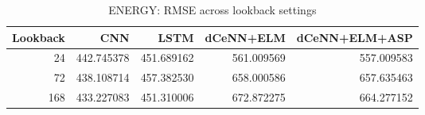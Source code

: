 \begin{table}
\caption{ENERGY: RMSE across lookback settings}
\begin{tabular}{rrrrr}
\toprule
Lookback & CNN & LSTM & dCeNN+ELM & dCeNN+ELM+ASP \\
\midrule
24 & 442.745378 & 451.689162 & 561.009569 & 557.009583 \\
72 & 438.108714 & 457.382530 & 658.000586 & 657.635463 \\
168 & 433.227083 & 451.310006 & 672.872275 & 664.277152 \\
\bottomrule
\end{tabular}
\end{table}
